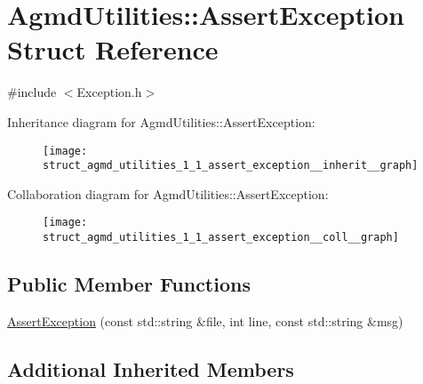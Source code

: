 \hypertarget{struct_agmd_utilities_1_1_assert_exception}{\section{Agmd\+Utilities\+:\+:Assert\+Exception Struct Reference}
\label{struct_agmd_utilities_1_1_assert_exception}
}


{\ttfamily \#include $<$Exception.\+h$>$}



Inheritance diagram for Agmd\+Utilities\+:\+:Assert\+Exception\+:\nopagebreak
\begin{figure}[H]
\begin{center}
\leavevmode
\texttt{[image: struct\_agmd\_utilities\_1\_1\_assert\_exception\_\_inherit\_\_graph]}
\end{center}
\end{figure}


Collaboration diagram for Agmd\+Utilities\+:\+:Assert\+Exception\+:\nopagebreak
\begin{figure}[H]
\begin{center}
\leavevmode
\texttt{[image: struct\_agmd\_utilities\_1\_1\_assert\_exception\_\_coll\_\_graph]}
\end{center}
\end{figure}
\subsection*{Public Member Functions}
\begin{DoxyCompactItemize}
\item 
\hyperlink{struct_agmd_utilities_1_1_assert_exception_abcd71f515702955463f7e82e4ba3e523}{Assert\+Exception} (const std\+::string \&file, int line, const std\+::string \&msg)
\end{DoxyCompactItemize}
\subsection*{Additional Inherited Members}


